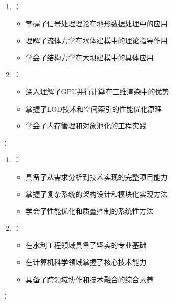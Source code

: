\begin{enumerate}
\def\labelenumi{\arabic{enumi}.}
\tightlist
\item
  ：

  \begin{itemize}
  \tightlist
  \item
    掌握了信号处理理论在地形数据处理中的应用
  \item
    理解了流体力学在水体建模中的理论指导作用
  \item
    学会了结构力学在大坝建模中的具体应用
  \end{itemize}
\item
  ：

  \begin{itemize}
  \tightlist
  \item
    深入理解了GPU并行计算在三维渲染中的优势
  \item
    掌握了LOD技术和空间索引的性能优化原理
  \item
    学会了内存管理和对象池化的工程实践
  \end{itemize}
\end{enumerate}

：

\begin{enumerate}
\def\labelenumi{\arabic{enumi}.}
\tightlist
\item
  ：

  \begin{itemize}
  \tightlist
  \item
    具备了从需求分析到技术实现的完整项目能力
  \item
    掌握了复杂系统的架构设计和模块化实现方法
  \item
    学会了性能优化和质量控制的系统性方法
  \end{itemize}
\item
  ：

  \begin{itemize}
  \tightlist
  \item
    在水利工程领域具备了坚实的专业基础
  \item
    在计算机科学领域掌握了核心技术能力
  \item
    具备了跨领域协作和技术融合的综合素养
  \end{itemize}
\end{enumerate}

：

